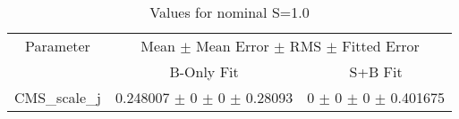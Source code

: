 \begin{table}
\centering
\caption{Values for nominal S=1.0}
\begin{tabular}{ccc}
\toprule
Parameter 	& \multicolumn{2}{c}{Mean $\pm$ Mean Error $\pm$ RMS $\pm$ Fitted Error}\\
 	& B-Only Fit & S+B Fit\\
\midrule
CMS\_scale\_j 	& \num{0.248007} $\pm$ \num{0} $\pm$ \num{0} $\pm$ \num{0.28093} 	& \num{0} $\pm$ \num{0} $\pm$ \num{0} $\pm$ \num{0.401675}\\
\bottomrule
\end{tabular}
\end{table}